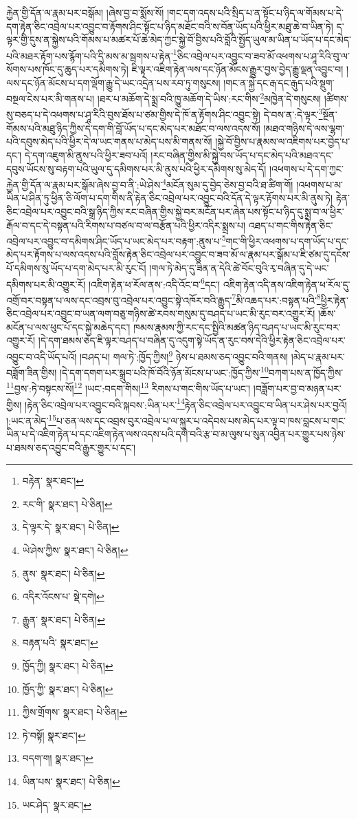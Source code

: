 རྐྱེན་གྱི་དོན་ལ་རྣམ་པར་བསྒོམ། །ཞེས་བྱ་བ་སྨོས་སོ། །གང་དག་འདས་པའི་སྲིད་པ་ན་སྟོང་པ་ཉིད་ལ་གོམས་པ་དེ་དག་རྟེན་ཅིང་འབྲེལ་པར་འབྱུང་བ་རྟོགས་ཤིང་སྟོང་པ་ཉིད་མཐོང་བའི་ས་བོན་ཡོད་པའི་ཕྱིར་མཐུ་ཆེ་བ་ཡིན་ཏེ། ད་ལྟར་གྱི་དུས་ན་སྐྱེས་པའི་གོམས་པ་མཚར་པོ་ཆེ་མེད་ཀྱང་སྐྱེ་བོ་བྱིས་པའི་བློའི་སྤྱོད་ཡུལ་མ་ཡིན་པ་ཡོད་པ་དང་མེད་པའི་མཐར་རྟོག་པས་རྙོག་པའི་དྲི་མས་མ་སྦགས་པ་རྟེན་\footnote{བརྟེན་  སྣར་ཐང་། }ཅིང་འབྲེལ་པར་འབྱུང་བ་ཟབ་མོ་འཕགས་པ་ཤཱ་རིའི་བུ་ལ་སོགས་པས་ཁོང་དུ་ཆུད་པར་དམིགས་ཏེ། ཇི་ལྟར་འཇིག་རྟེན་ལས་དང་ཉོན་མོངས་རྒྱུར་བྱས་བྱེད་རྒྱུ་ལྡན་འབྱུང་བ། །ལས་དང་ཉོན་མོངས་པ་དག་ལྡོག་རྒྱུ་དེ་ཡང་འདྲེན་པས་རབ་ཏུ་གསུངས། །གང་ན་སྐྱེ་དང་རྒ་དང་རྒུད་པའི་སྡུག་བསྔལ་ངེས་པར་མི་གནས་པ། །ཐར་པ་མཆོག་དེ་སྨྲ་བའི་ཁྱུ་མཆོག་དེ་ཡིས་:རང་གིས་\footnote{རང་གི་  སྣར་ཐང་།  པེ་ཅིན། }མཁྱེན་དེ་གསུངས། །ཚིགས་སུ་བཅད་པ་དེ་འཕགས་པ་ཤཱ་རིའི་བུས་ཐོས་པ་ཙམ་གྱིས་དེ་ཁོ་ན་རྟོགས་ཤིང་འབྱུང་སྟེ། དེ་བས་ན་:དེ་ལྟར་\footnote{དེ་ལྟར་དེ་  སྣར་ཐང་།  པེ་ཅིན། }སྔོན་གོམས་པའི་མཐུ་ཉིད་ཀྱིས་དེ་དག་གི་བློ་ཡོད་པ་དང་མེད་པར་མཐོང་བ་ལས་འདས་སོ། །མཐའ་གཉིས་དེ་ལས་ལྷག་པའི་དབུས་མེད་པའི་ཕྱིར་དེ་ལ་ཡང་གནས་པ་མེད་པས་མི་གནས་སོ། །སྐྱེ་བོ་བྱིས་པ་རྣམས་ལ་འཇིགས་པར་བྱེད་པ་དང་། དེ་དག་འཇུག་མི་ནུས་པའི་ཕྱིར་ཟབ་པའོ། །རང་བཞིན་གྱིས་མི་སྐྱེ་བས་ཡོད་པ་དང་མེད་པའི་མཐའ་དང་དབུས་ཡོངས་སུ་བརྟག་པའི་ཡུལ་དུ་དམིགས་པར་མི་ནུས་པའི་ཕྱིར་དམིགས་སུ་མེད་དོ། །འཕགས་པ་དེ་དག་ཀྱང་རྐྱེན་གྱི་དོན་ལ་རྣམ་པར་སྒོམ་ཞེས་བྱ་བ་ནི་:ཡེ་ཤེས་\footnote{ཡེ་ཤེས་ཀྱིས་  སྣར་ཐང་།  པེ་ཅིན། }མངོན་སུམ་དུ་བྱེད་ཅེས་བྱ་བའི་ཐ་ཚིག་གོ། །འཕགས་པ་མ་ཡིན་པ་ཤིན་ཏུ་ཕྱིན་ཅི་ལོག་པ་དག་གིས་ནི་རྟེན་ཅིང་འབྲེལ་པར་འབྱུང་བའི་དོན་དེ་ལྟར་རྟོགས་པར་མི་ནུས་ཏེ། རྟེན་ཅིང་འབྲེལ་པར་འབྱུང་བའི་སྒྲ་ཉིད་ཀྱིས་རང་བཞིན་གྱིས་སྐྱེ་བར་མངོན་པར་ཞེན་པས་སྟོང་པ་ཉིད་དུ་སྨྲ་བ་ལ་ཕྱིར་རྒོལ་བ་དང་དེ་བསྟན་པའི་རིགས་པ་བཙལ་བ་ལ་བརྩོན་པའི་ཕྱིར་འདིར་སྨྲས་པ། འཐད་པ་གང་གིས་རྟེན་ཅིང་འབྲེལ་པར་འབྱུང་བ་དམིགས་ཤིང་ཡོད་པ་ཡང་མེད་པར་བརྟག་:ནུས་པ་\footnote{ནུས་  སྣར་ཐང་།  པེ་ཅིན། }གང་གི་ཕྱིར་འཕགས་པ་དག་ཡོད་པ་དང་མེད་པར་རྟོགས་པ་ལས་འདས་པའི་བློས་རྟེན་ཅིང་འབྲེལ་པར་འབྱུང་བ་ཟབ་མོ་ལ་རྣམ་པར་སྒོམ་པ་ཇི་ཙམ་དུ་དངོས་པོ་དམིགས་སུ་ཡོད་པ་དག་མེད་པར་མི་རུང་ངོ། །གལ་ཏེ་མེད་དུ་ཟིན་ན་དེའི་ཚེ་བོང་བུའི་རྭ་བཞིན་དུ་དེ་ཡང་དམིགས་པར་མི་འགྱུར་རོ། །འཇིག་རྟེན་ཕ་རོལ་ནས་:འདི་འོང་བ་\footnote{འདིར་འོངས་པ་  སྡེ་དགེ། }དང་། འཇིག་རྟེན་འདི་ནས་འཇིག་རྟེན་ཕ་རོལ་དུ་འགྲོ་བར་བསྟན་པ་ལས་དང་འབྲས་བུ་འབྲེལ་པར་འབྱུང་སྟེ་འཁོར་བའི་རྒྱུད་\footnote{རྒྱུན་  སྣར་ཐང་།  པེ་ཅིན། }མི་འཆད་པར་:བསྟན་པའི་\footnote{བརྟན་པའི་  སྣར་ཐང་། }ཕྱིར་རྟེན་ཅིང་འབྲེལ་པར་འབྱུང་བ་ཡན་ལག་བཅུ་གཉིས་ཚེ་རབས་གསུམ་དུ་བཤད་པ་ཡང་མི་རུང་བར་འགྱུར་རོ། །ཆོས་མངོན་པ་ལས་ཕུང་པོ་དང་སྐྱེ་མཆེད་དང་། ཁམས་རྣམས་ཀྱི་རང་དང་སྤྱིའི་མཚན་ཉིད་བཤད་པ་ཡང་མི་རུང་བར་འགྱུར་རོ། །དེ་དག་ཐམས་ཅད་ཇི་ལྟར་བཤད་པ་བཞིན་དུ་འདུག་སྟེ་ཡོད་ན་རུང་བས་དེའི་ཕྱིར་རྟེན་ཅིང་འབྲེལ་པར་འབྱུང་བ་འདི་ཡོད་པའོ། །བཤད་པ། གལ་ཏེ་:ཁྱོད་ཀྱིས།\footnote{ཁྱོད་ཀྱི།  སྣར་ཐང་།  པེ་ཅིན། } ཉེས་པ་ཐམས་ཅད་འབྱུང་བའི་གནས། །མེད་པ་རྣམ་པར་བཟློག་ཟིན་གྱིས། །དེ་དག་དགག་པར་སྒྲུབ་པའི་ཁོ་བོའི་ཉོན་མོངས་པ་ཡང་:ཁྱོད་ཀྱིས་\footnote{ཁྱོད་ཀྱི་  སྣར་ཐང་།  པེ་ཅིན། }བཀག་པས་ན་ཁྱོད་ཀྱིས་\footnote{ཀྱིས་གྲོགས་  སྣར་ཐང་།  པེ་ཅིན། }བྱས་:ཏེ་བསྟངས་སོ།\footnote{ཏེ་བསྟོ།  སྣར་ཐང་། } །ཡང་:བདག་གིས།\footnote{བདག་ག།  སྣར་ཐང་། } རིགས་པ་གང་གིས་ཡོད་པ་ཡང་། །བཟློག་པར་བྱ་བ་མཉན་པར་གྱིས། །རྟེན་ཅིང་འབྲེལ་པར་འབྱུང་བའི་སྐབས་:ཡིན་པར་\footnote{ཡིན་པས་  སྣར་ཐང་།  པེ་ཅིན། }རྟེན་ཅིང་འབྲེལ་པར་འབྱུང་བ་ཡིན་པར་ཤེས་པར་བྱའོ། །:ཡང་ན་མེད་\footnote{ཡང་ཤེད་  སྣར་ཐང་། }པ་ཅན་ལས་དང་འབྲས་བུར་འབྲེལ་པ་ལ་སྐུར་པ་འདེབས་པས་མེད་པར་ལྟ་བ་ཁས་བླངས་པ་གང་ཡིན་པ་དེ་འཇིག་རྟེན་པ་དང་འཇིག་རྟེན་ལས་འདས་པའི་དགེ་བའི་རྩ་བ་མ་ལུས་པ་སུན་འབྱིན་པར་གྱུར་པས་ཉེས་པ་ཐམས་ཅད་འབྱུང་བའི་རྒྱུར་གྱུར་པ་དང་། 